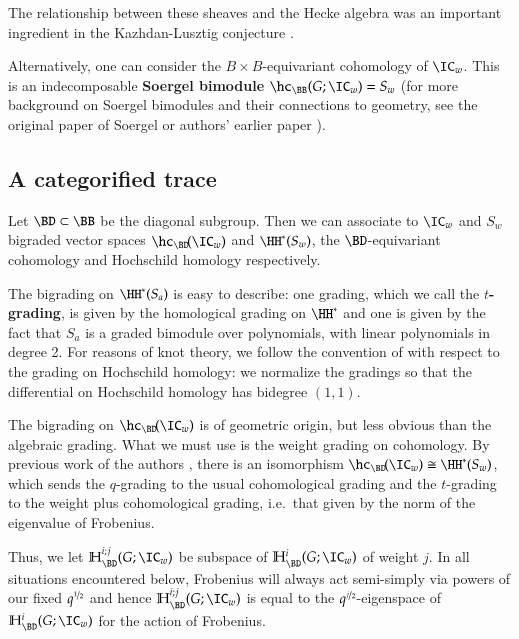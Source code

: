 \documentclass[12pt]{amsart}
\theoremstyle{remark}
\begin{document}
The relationship between these sheaves and the Hecke algebra was an
important ingredient in the Kazhdan-Lusztig conjecture
\cite{KL79,KL80}.


Alternatively, one can consider the $B \! \times \! B$-equivariant cohomology of
$\IC_w$.  This is an indecomposable {\bf Soergel bimodule} 
$\hc_{\BB}(G;\IC_w)=S_w$ (for
more background on Soergel bimodules and their connections to
geometry, see the original paper
\cite{Soe92} of Soergel or authors' earlier paper \cite{WW}).

\subsection{A categorified trace}
\label{sec:categorified-trace}

Let $\BD\subset\BB$ be the diagonal subgroup.  Then we can associate
to $\IC_w$ and $S_w$ bigraded vector spaces $\hc_{\BD}\!(\IC_w)$ and
$\HH^*(S_w)$, the $\BD$-equivariant cohomology and Hochschild
homology respectively.

The bigrading on $\HH^*(S_a)$ is easy to describe: one grading, which
we call the {\bf $t$-grading}, is given by the homological grading on
$\HH^*$ and one is given by the
fact that $S_a$ is a graded bimodule over polynomials, with linear
polynomials in degree 2.  For reasons of knot theory,  we follow the convention of \cite{MSV} with respect to the grading on Hochschild homology: we normalize the gradings so that the differential on Hochschild homology has bidegree $(1,1)$.

The bigrading on $\hc_{\BD}\!(\IC_w)$ is of geometric origin, but less
obvious than the algebraic grading.  What we must use is the weight
grading on cohomology.  
By previous work of the authors \cite[Theorem
1.4]{WW}, there is an isomorphism $\hc_{\BD}\!(\IC_w)\cong \HH^*(S_w)$,
which sends the $q$-grading to the usual cohomological grading and the
$t$-grading to the weight plus cohomological grading, i.e.\ that given
by the norm of the eigenvalue of Frobenius.



Thus, we let
$\mathbb{H}_{\BD}^{i;j}(G;\IC_w)$ be subspace of
$\mathbb{H}_{\BD}^{i}(G;\IC_w)$ of weight $j$. In all situations
encountered below, Frobenius will always act semi-simply via powers of our fixed $q^{\nicefrac 12}$ and hence $\mathbb{H}_{\BD}^{i;j}(G; \IC_w)$ is equal to the $q^{\nicefrac{j}{2}}$-eigenspace of $\mathbb{H}_{\BD}^{i}(G; \IC_w)$ for the action of Frobenius.

\end{document}
